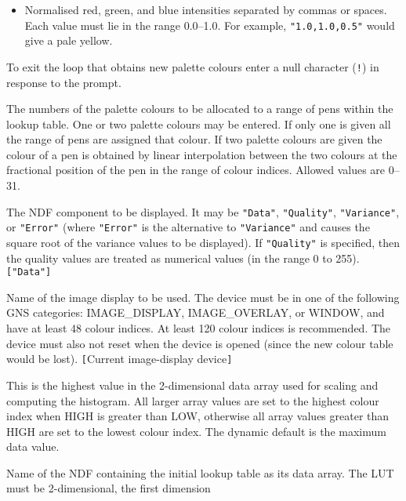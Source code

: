 \documentclass[twoside,11pt]{article}
\newcommand{\sstsubsection}[1]{ \item[{#1}] \mbox{} \\}
\renewcommand{\sstsubsection}[1]{\item[{#1}]}
\begin{document}
{{{\begin{itemize}
           \item Normalised red, green, and blue intensities separated by
           commas or spaces.  Each value must lie in the range 0.0--1.0.
           For example, {\tt "1.0,1.0,0.5"} would give a pale yellow.
         \end{itemize}
         To exit the loop that obtains new palette colours enter a null
         character ({\tt !}) in response to the prompt.
      }
      \sstsubsection{
         COLRANGE() = \_INTEGER (Read)
      }{
         The numbers of the palette colours to be allocated to a range
         of pens within the lookup table.  One or two palette colours
         may be entered.  If only one is given all the range of pens
         are assigned that colour.  If two palette colours are given
         the colour of a pen is obtained by linear interpolation
         between the two colours at the fractional position of the pen
         in the range of colour indices.  Allowed values are 0--31.
      }
      \sstsubsection{
         COMP = LITERAL (Read)
      }{
         The NDF component to be displayed.  It may be {\tt "Data"},
         {\tt "Quality"}, {\tt "Variance"}, or {\tt "Error"} (where
         {\tt "Error"} is the alternative to {\tt "Variance"} and causes
         the square root of the variance values to be displayed).
         If {\tt "Quality"} is specified, then the quality values are
         treated as numerical values (in the range 0 to 255).  {\tt ["Data"]}
      }
      \sstsubsection{
         DEVICE = DEVICE (Read)
      }{
         Name of the image display to be used.  The device must be in
         one of the following GNS categories: IMAGE\_DISPLAY,
         IMAGE\_OVERLAY, or WINDOW, and have at least 48 colour indices.
         At least 120 colour indices is recommended.  The device must
         also not reset when the device is opened (since the new colour
         table would be lost).  {\tt [}Current image-display device{\tt ]}
      }
      \sstsubsection{
         HIGH = \_DOUBLE (Read)
      }{
         This is the highest value in the 2-dimensional data array used for
         scaling and computing the histogram.  All larger array values
         are set to the highest colour index when HIGH is greater than
         LOW, otherwise all array values greater than HIGH are set to
         the lowest colour index.  The dynamic default is the maximum
         data value.
      }
      \sstsubsection{
         INLUT = NDF (Read)
      }{
         Name of the NDF containing the initial lookup table as its data
         array.  The LUT must be 2-dimensional, the first dimension
}}}
\end{document}
